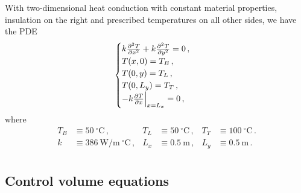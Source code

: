 \documentclass{article}
\begin{document}
With two-dimensional heat conduction with constant material properties, insulation on the right and prescribed temperatures on all other sides, we have the PDE
\begin{equation}
	\begin{cases}
		k \pdv{^2T}{x^2} + k \pdv{^2T}{y^2} = 0\,,\\
		T(x, 0) = T_B\,,\\
		T(0, y) = T_L\,,\\
		T(0, L_y) = T_T\,,\\
		-k \pdv{T}{x} \Big|_{x = L_x} = 0\,,
	\end{cases}
\end{equation}
where
\begin{align*}
	T_B & \equiv 50~^\circ\text{C}\,, & T_L & \equiv 50~^\circ\text{C}\,, & T_T & \equiv 100~^\circ\text{C}\,.\\
	k & \equiv 386~\text{W/m}~^\circ\text{C}\,, & L_x & \equiv 0.5~\text{m}\,, & L_y & \equiv 0.5~\text{m}\,.\\
\end{align*}

\subsection*{Control volume equations}

\end{document}
